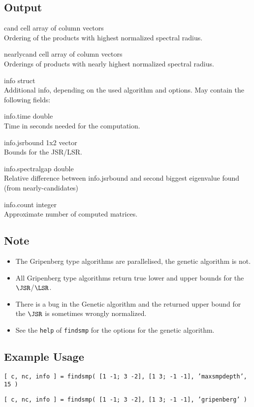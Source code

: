 \subsection*{Output}
\begin{param}
\item[cand]         cell array of column vectors\\Ordering of the products with highest normalized spectral radius.
\item[nearlycand]   cell array of column vectors\\Orderings of products with nearly highest normalized spectral radius.
\item[info]         struct\\Additional info, depending on the used algorithm and options.  May contain the following fields:
    \begin{param}
    \item[info.time] double\\ Time in seconds needed for the computation.
    \item[info.jsrbound] 1x2 vector\\Bounds for the JSR/LSR.
    \item[info.spectralgap] double\\Relative difference between info.jsrbound and second biggest eigenvalue found (from nearly-candidates)
    \item[info.count] integer\\
    Approximate number of computed matrices.
    \end{param}
\end{param}

\subsection*{Note}
\begin{itemize}
\item The Gripenberg type algorithms are parallelised, the genetic algorithm is not.
\item All Gripenberg type algorithms return true lower and upper bounds for the $\JSR$/$\LSR$.
\item There is a bug in the Genetic algorithm and the returned upper bound for the $\JSR$ is sometimes wrongly normalized.
\item See the \texttt{help} of \texttt{findsmp} for the options for the genetic algorithm.
\end{itemize}

\subsection*{Example Usage}
\begin{param}
\item[{\texttt{[ c, nc, info ] = findsmp( {[1 -1; 3 -2], [1 3; -1 -1]}, 'maxsmpdepth', 15 )}}]
\item[{\texttt{[ c, nc, info ] = findsmp( {[1 -1; 3 -2], [1 3; -1 -1]}, 'gripenberg' )}}]
\end{param}

